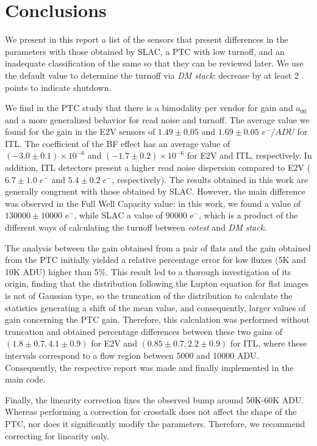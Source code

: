 \section{Conclusions} \label{sec:conclusions}

We present in this report a list of the sensors that present differences in the parameters with those obtained by SLAC, a PTC with low turnoff, and an inadequate classification of the same so that they can be reviewed later. We use the default value to determine the turnoff via \textit{DM stack}: decrease by at least 2 points to indicate shutdown.

\vspace{3mm}

We find in the PTC study that there is a bimodality per vendor for gain and $a_{00}$ and a more generalized behavior for read noise and turnoff. The average value we found for the gain in the E2V sensors of $1.49 \pm 0.05$ and $1.69 \pm 0.05$ $e^{-}/ADU$ for ITL. The coefficient of the BF effect has an average value of $(-3.0 \pm 0.1)\times 10 ^{-6}$ and $(-1.7 \pm 0.2)\times 10 ^{-6}$ for E2V and ITL, respectively. In addition, ITL detectors present a higher read noise dispersion compared to E2V ($6.7 \pm 1.0 \; e^{-}$ and $5.4 \pm 0.2 \; e^{-}$, respectively). The results obtained in this work are generally congruent with those obtained by SLAC. However, the main difference was observed in the Full Well Capacity value: in this work, we found a value of $130000 \pm 10000$ e$^-$, while SLAC a value of $90000$ e$^-$, which is a product of the different ways of calculating the turnoff between \textit{eotest} and \textit{DM stack}.

\vspace{3mm}

The analysis between the gain obtained from a pair of flats and the gain obtained from the PTC initially yielded a relative percentage error for low fluxes (5K and 10K ADU) higher than 5\%. This result led to a thorough investigation of its origin, finding that the distribution following the Lupton equation for flat images is not of Gaussian type, so the truncation of the distribution to calculate the statistics generating a shift of the mean value, and consequently, larger values of gain concerning the PTC gain. Therefore, this calculation was performed without truncation and obtained percentage differences between these two gains of $(1.8 \pm 0.7, 4.1 \pm 0.9)$ for E2V and $(0.85 \pm 0.7, 2.2 \pm 0.9)$ for ITL, where these intervals correspond to a flow region between 5000 and 10000 ADU. Consequently, the respective report was made and finally implemented in the main code. 


\vspace{3mm}

Finally, the linearity correction fixes the observed bump around 50K-60K ADU. Whereas performing a correction for crosstalk does not affect the shape of the PTC, nor does it significantly modify the parameters. Therefore, we recommend correcting for linearity only.  


